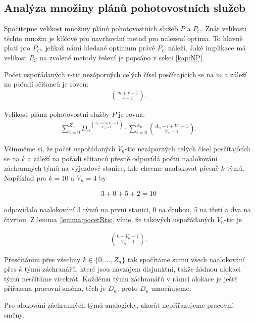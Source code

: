 \subsection{Analýza množiny plánů pohotovostních služeb}\label{kap:analP}

Spočítejme velikost množiny plánů pohotovostních služeb $P$ a $P_C$.
Znát velikosti těchto množin je klíčové pro navrhování metod pro nalezení optima.
To hlavně platí pro $P_C$, jelikož námi hledané optimum právě $P_C$ náleží.
Jaké implikace má velikost $P_C$ na zvolené metody řešení je popsáno v sekci \ref{kap:NP}.

\begin{lemma}\label{lemma:pocetRtic}
  Počet uspořádaných $r$-tic nezáporných celých čísel posčítajících se na $m$ a záleží na pořadí sčítanců je roven: 
  \begin{align*}
    \binom{m + r - 1}{r - 1}.
  \end{align*}
\end{lemma}

\begin{veta}\label{veta:velikostP}
  Velikost plánu pohotovostní služby $P$ je rovna:
  \begin{align*}
    \sum_{i = 0}^{Z_n} {D_n}^{\binom{Z_n - i + V_n - 1}{V_n - 1}} \cdot \sum_{i = 0}^{A_n} {\binom{A_n - i + V_n - 1}{V_n - 1}}.
  \end{align*}
\end{veta}

\begin{dukaz}
  Všimněme si, že počet uspořádaných $V_n$-tic nezáporných celých čísel posčítajících se na $k$
  a záleží na pořadí sčítanců přesně odpovídá počtu naalokování záchranných týmů na výjezdové stanice, kde chceme naalokovat přesně $k$ týmů.
  Například pro $k = 10$ a $V_n = 4$ by

  \begin{align*}
    3 + 0 + 5 + 2 = 10
  \end{align*}

  odpovídalo naalokování 3 týmů na první stanici, 0 na druhou, 5 na třetí a dva na čtvrtou.
  Z lemma \ref{lemma:pocetRtic} víme, že takových uspořádaných $V_n$-tic je

  \begin{align}
    \binom{k + V_n - 1}{V_n - 1}.
  \end{align}

  Přesčítáním přes všechny $k \in \{ 0, \dots, Z_n \}$ tak spočítáme sumu všech naalokování přes $k$ týmů záchranářů, které jsou navzájem disjunktní, takže žádnou alokaci týmů nesčítáme vícekrát.
  Každému týmu záchranářů v rámci alokace je ještě přiřazena pracovní směna, těch je $D_n$, proto $D_n$ umocňujeme. 

  Pro alokování záchranných týmů analogicky, akorát nepřiřazujeme pracovní směny.
\end{dukaz}

